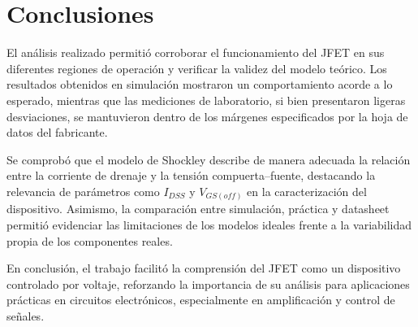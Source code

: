 \chapter{Conclusiones}
El análisis realizado permitió corroborar el funcionamiento del JFET en sus diferentes regiones de operación y verificar
la validez del modelo teórico. Los resultados obtenidos en simulación mostraron un comportamiento acorde a lo esperado,
mientras que las mediciones de laboratorio, si bien presentaron ligeras desviaciones, se mantuvieron dentro de los
márgenes especificados por la hoja de datos del fabricante.

Se comprobó que el modelo de Shockley describe de manera adecuada la relación entre la corriente de drenaje y la tensión
compuerta–fuente, destacando la relevancia de parámetros como $I_{DSS}$ y $V_{GS(off)}$ en la caracterización del
dispositivo. Asimismo, la comparación entre simulación, práctica y datasheet permitió evidenciar las limitaciones de los
modelos ideales frente a la variabilidad propia de los componentes reales.

En conclusión, el trabajo facilitó la comprensión del JFET como un dispositivo controlado por voltaje, reforzando la
importancia de su análisis para aplicaciones prácticas en circuitos electrónicos, especialmente en amplificación y
control de señales.
